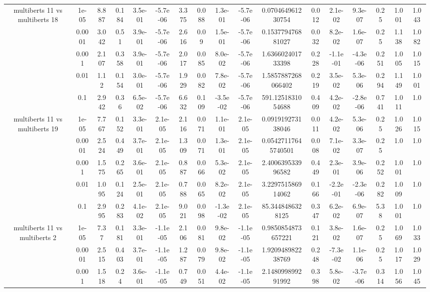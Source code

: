 \begin{tabular}{|c|c|c|c|c|c|c|c|c|c|c|c|c|c|c|c|c|}
\hline
\multirow{5}{*}{multiberts 11 vs multiberts 18} & 1e-05 & 8.887 & 0.184 & 3.5e-01 & -5.7e-06 & 3.375 & 0.088 & 1.3e-01 & -5.7e-06 & 0.070464961230754 & 0.012 & 2.1e-02 & 9.3e-07 & 0.25 & 1.001 & 1.043 \\
 & 0.0001 & 3.042 & 0.51 & 3.9e-01 & -5.7e-06 & 2.616 & 0.09 & 1.5e-01 & -5.7e-06 & 0.153779476881027 & 0.032 & 8.2e-02 & 1.6e-07 & 0.25 & 1.138 & 1.082 \\
 & 0.001 & 2.107 & 0.358 & 3.9e-01 & -5.7e-06 & 2.017 & 0.085 & 8.0e-02 & -5.7e-06 & 1.636602401733398 & 0.228 & -1.1e-01 & -4.3e-06 & 0.251 & 1.005 & 1.015 \\
 & 0.01 & 1.12 & 0.154 & 3.0e-01 & -5.7e-06 & 1.929 & 0.082 & 7.8e-02 & -5.7e-06 & 1.5857887268066402 & 0.219 & 3.5e-02 & 5.3e-06 & 0.294 & 1.149 & 1.001 \\
 & 0.1 & 2.942 & 0.36 & 6.5e-02 & -5.7e-06 & 6.632 & 0.109 & -3.5e-02 & -5.7e-06 & 591.1251831054688 & 0.409 & 4.2e-02 & -2.8e-06 & 0.741 & 1.011 & 1.0 \\
\hline
\multirow{5}{*}{multiberts 11 vs multiberts 19} & 1e-05 & 7.767 & 0.152 & 3.3e-01 & 2.1e-05 & 2.116 & 0.071 & 1.1e-01 & 2.1e-05 & 0.091919273138046 & 0.011 & 4.2e-02 & 5.3e-06 & 0.25 & 1.026 & 1.015 \\
 & 0.0001 & 2.524 & 0.449 & 3.7e-01 & 2.1e-05 & 1.309 & 0.071 & 1.3e-01 & 2.1e-05 & 0.05427117645740501 & 0.008 & 7.1e-02 & 3.3e-07 & 0.25 & 1.0 & 1.0 \\
 & 0.001 & 1.575 & 0.265 & 3.6e-01 & 2.1e-05 & 0.887 & 0.066 & 5.3e-02 & 2.1e-05 & 2.400639533996582 & 0.449 & 2.3e-01 & 3.9e-06 & 0.252 & 1.001 & 1.0 \\
 & 0.01 & 1.095 & 0.124 & 2.5e-01 & 2.1e-05 & 0.788 & 0.065 & 8.2e-02 & 2.1e-05 & 3.229751586914062 & 0.166 & -2.2e-01 & -2.3e-06 & 0.282 & 1.009 & 1.0 \\
 & 0.1 & 2.995 & 0.283 & 4.1e-02 & 2.1e-05 & 9.021 & 0.098 & -1.3e-02 & 2.1e-05 & 85.3448486328125 & 0.347 & 6.2e-02 & 6.9e-07 & 5.38 & 1.001 & 1.0 \\
\hline
\multirow{5}{*}{multiberts 11 vs multiberts 2} & 1e-05 & 7.37 & 0.181 & 3.3e-01 & -1.1e-05 & 2.106 & 0.081 & 9.8e-02 & -1.1e-05 & 0.9850854873657221 & 0.121 & 3.8e-02 & 1.6e-07 & 0.25 & 1.069 & 1.033 \\
 & 0.0001 & 2.515 & 0.403 & 3.7e-01 & -1.1e-05 & 1.287 & 0.079 & 9.8e-02 & -1.1e-05 & 1.920948982238769 & 0.248 & -7.3e-02 & 1.1e-06 & 0.25 & 1.017 & 1.029 \\
 & 0.001 & 1.518 & 0.24 & 3.6e-01 & -1.1e-05 & 0.749 & 0.051 & 4.4e-02 & -1.1e-05 & 2.148099899291992 & 0.398 & 5.8e-02 & -3.7e-06 & 0.314 & 1.056 & 1.045 \\

\end{tabular}
